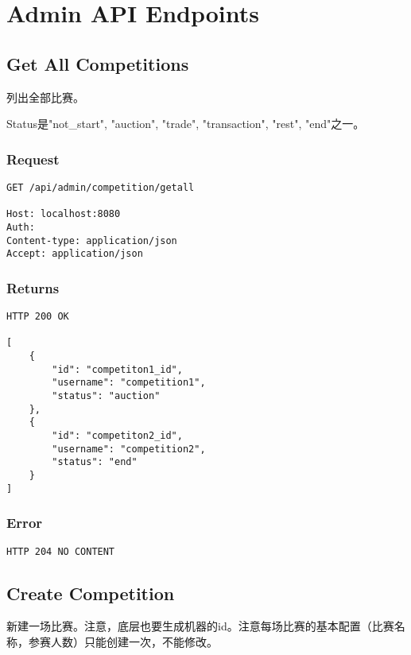 \documentclass{article}
\begin{document}
\section{Admin API Endpoints}
\subsection{Get All Competitions}

列出全部比赛。

Status是"not_start", "auction", "trade", "transaction", "rest", "end"之一。

\subsubsection*{Request}
\begin{lstlisting}
GET /api/admin/competition/getall

Host: localhost:8080
Auth:
Content-type: application/json
Accept: application/json
\end{lstlisting}

\subsubsection*{Returns}
\begin{lstlisting}
HTTP 200 OK

[
	{
	    "id": "competiton1_id",
	    "username": "competition1",
	    "status": "auction"
	},
	{
	    "id": "competiton2_id",
	    "username": "competition2",
	    "status": "end"
	}
]
\end{lstlisting}

\subsubsection*{Error}
\begin{lstlisting}
HTTP 204 NO CONTENT
\end{lstlisting}

\subsection{Create Competition}
新建一场比赛。注意，底层也要生成机器的id。注意每场比赛的基本配置（比赛名称，参赛人数）只能创建一次，不能修改。
\end{document}
